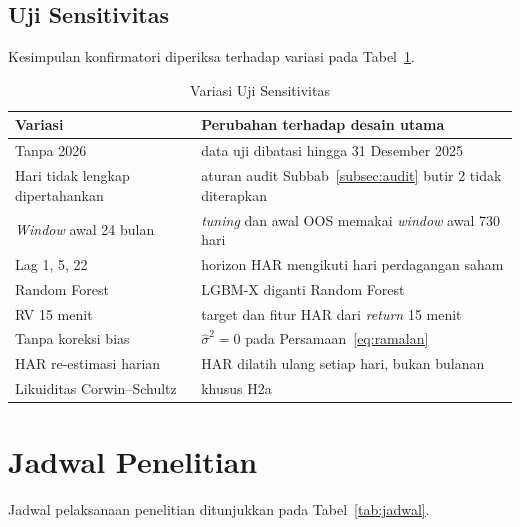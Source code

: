 \subsection{Uji Sensitivitas}
Kesimpulan konfirmatori diperiksa terhadap variasi pada
Tabel~\ref{tab:sensitivitas}.

\begin{table}[htbp]
  \caption{Variasi Uji Sensitivitas}
  \label{tab:sensitivitas}
  \centering
  \begingroup
  \small
  \begin{tabular}{|p{}|p{}|}
    \hline
    \textbf{Variasi} & \textbf{Perubahan terhadap desain utama} \\
    \hline
    Tanpa 2026 & data uji dibatasi hingga 31 Desember 2025 \\
    \hline
    Hari tidak lengkap dipertahankan & aturan audit
      Subbab~\ref{subsec:audit} butir 2 tidak diterapkan \\
    \hline
    \textit{Window} awal 24 bulan & \textit{tuning} dan awal OOS memakai
      \textit{window} awal 730 hari \\
    \hline
    Lag 1, 5, 22 & horizon HAR mengikuti hari perdagangan saham \\
    \hline
    Random Forest & LGBM-X diganti Random Forest \\
    \hline
    RV 15 menit & target dan fitur HAR dari \textit{return} 15 menit \\
    \hline
    Tanpa koreksi bias & $\hat\sigma^2 = 0$ pada
      Persamaan~\eqref{eq:ramalan} \\
    \hline
    HAR re-estimasi harian & HAR dilatih ulang setiap hari, bukan bulanan \\
    \hline
    Likuiditas Corwin--Schultz & khusus H2a \\
    \hline
  \end{tabular}
  \endgroup
\end{table}

\section{Jadwal Penelitian}
Jadwal pelaksanaan penelitian ditunjukkan pada Tabel~\ref{tab:jadwal}.


